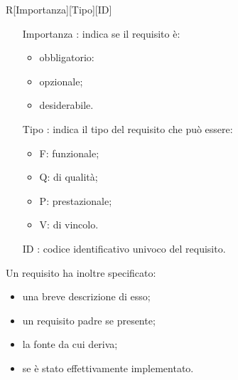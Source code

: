 		\centerline{R[Importanza][Tipo][ID]}
		\begin{itemize}
		
			\item[Importanza]: indica se il requisito è:
			
			\begin{itemize}
				\item obbligatorio:
				\item opzionale;
				\item desiderabile.
			\end{itemize}
			
			\item[Tipo]: indica il tipo del requisito che può essere:
			
			\begin{itemize}
				\item F: funzionale;
				\item Q: di qualità;
				\item P: prestazionale;
				\item V: di vincolo.
			\end{itemize}
			
			\item [ID]: codice identificativo univoco del requisito.
			
		\end{itemize}
		
	    Un requisito ha inoltre specificato:
		\begin{itemize}
		\item una breve descrizione di esso;
		\item un requisito padre se presente;
		\item la fonte da cui deriva;
		\item se è stato effettivamente implementato.
		\end{itemize}

